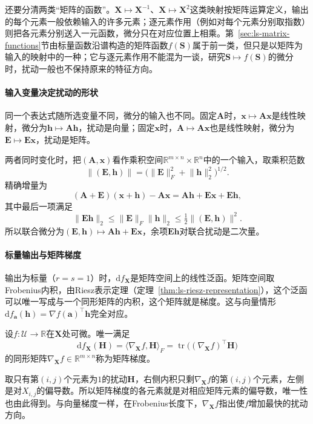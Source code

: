 还要分清两类“矩阵的函数”。$\bm X\mapsto\bm X^{-1}$、$\bm X\mapsto\bm X^2$这类映射按矩阵运算定义，输出的每个元素一般依赖输入的许多元素；逐元素作用（例如对每个元素分别取指数）则把各元素分别送入一元函数，微分只在对应位置上相乘。第~\ref{sec:ls-matrix-functions}节由标量函数沿谱构造的矩阵函数$f(\bm S)$属于前一类，但只是以矩阵为输入的映射中的一种；它与逐元素作用不能混为一谈，研究$\bm S\mapsto f(\bm S)$的微分时，扰动一般也不保持原来的特征方向。

\paragraph{输入变量决定扰动的形状}
同一个表达式随所选变量不同，微分的输入也不同。固定$\bm A$时，$\bm x\mapsto\bm A\bm x$是线性映射，微分为$\bm h\mapsto\bm A\bm h$，扰动是向量；固定$\bm x$时，$\bm A\mapsto\bm A\bm x$也是线性映射，微分为$\bm E\mapsto\bm E\bm x$，扰动是矩阵。

两者同时变化时，把$(\bm A,\bm x)$看作乘积空间$\mathbb R^{m\times n}\times\mathbb R^n$中的一个输入，取乘积范数
\[
 \lVert(\bm E,\bm h)\rVert=\bigl(\lVert\bm E\rVert_F^2+\lVert\bm h\rVert_2^2\bigr)^{1/2}.
\]
精确增量为
\[
 (\bm A+\bm E)(\bm x+\bm h)-\bm A\bm x=\bm A\bm h+\bm E\bm x+\bm E\bm h,
\]
其中最后一项满足
\[
 \lVert\bm E\bm h\rVert_2\leq\lVert\bm E\rVert_F\lVert\bm h\rVert_2\leq\tfrac12\lVert(\bm E,\bm h)\rVert^2.
\]
所以联合微分为$(\bm E,\bm h)\mapsto\bm A\bm h+\bm E\bm x$，余项$\bm E\bm h$对联合扰动是二次量。

\paragraph{标量输出与矩阵梯度}
输出为标量（$r=s=1$）时，$\mathrm df_{\bm X}$是矩阵空间上的线性泛函。矩阵空间取Frobenius内积，由Riesz表示定理（定理~\ref{thm:ls-riesz-representation}），这个泛函可以唯一写成与一个同形矩阵的内积，这个矩阵就是梯度。这与向量情形$\mathrm df_{\bm a}(\bm h)=\nabla f(\bm a)^\top\bm h$完全对应。
\begin{definition}[矩阵标量函数的梯度]
\label{def:multivariable-matrix-scalar-gradient}
设$f:\mathcal U\to\mathbb R$在$\bm X$处可微。唯一满足
\begin{equation}
 \mathrm df_{\bm X}(\bm H)=\langle\nabla_{\bm X}f,\bm H\rangle_F
 =\operatorname{tr}\bigl((\nabla_{\bm X}f)^\top\bm H\bigr)
\label{eq:analysis-matrix-gradient-definition}
\end{equation}
的同形矩阵$\nabla_{\bm X}f\in\mathbb R^{m\times n}$称为矩阵梯度。
\end{definition}
取只有第$(i,j)$个元素为$1$的扰动$\bm H$，右侧内积只剩$\nabla_{\bm X}f$的第$(i,j)$个元素，左侧是对$X_{i,j}$的偏导数。所以矩阵梯度的各元素就是对相应矩阵元素的偏导数，唯一性也由此得到。与向量梯度一样，在Frobenius长度下，$\nabla_{\bm X}f$指出使$f$增加最快的扰动方向。

